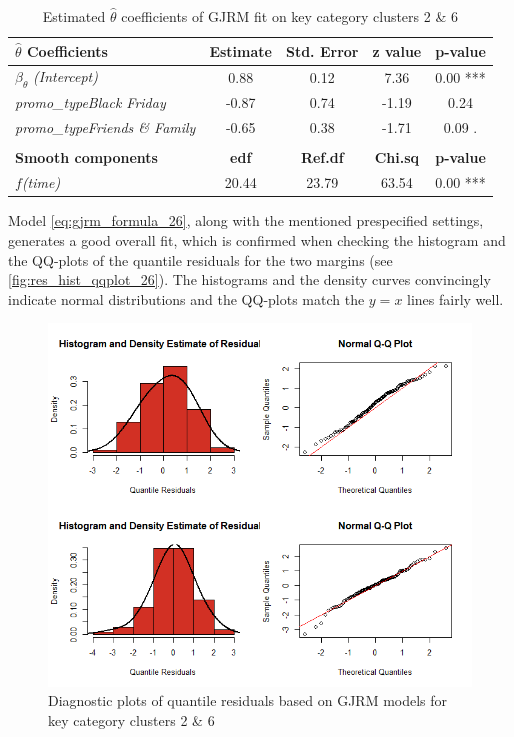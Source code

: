 \begin{table}[H]
\centering
\begin{tabular}{l|c|c|c|c}
\hline
                               \textbf{$\hat{\theta}$ Coefficients}       & \textbf{Estimate} & \textbf{Std. Error} & \textbf{z value} & \textbf{p-value}  \\ \hline\hline
$\beta_{\theta}$ \textit{(Intercept)}                  & 0.88     & 0.12       & 7.36    & 0.00 *** \\ 
\textit{promo\_typeBlack Friday}      & -0.87    & 0.74       & -1.19   & 0.24     \\ 
\textit{promo\_typeFriends \& Family} & -0.65    & 0.38       & -1.71   & 0.09 .   \\ \hline
& & & & \\ \hline
\textbf{Smooth components}            & \textbf{edf}      & \textbf{Ref.df}     & \textbf{Chi.sq}  & \textbf{p-value}  \\ \hline\hline
\textit{$f$(time)}                 & 20.44    & 23.79      & 63.54   & 0.00 *** \\ \hline
\end{tabular}
\caption{Estimated $\hat{\theta}$ coefficients of \ac{GJRM} fit on key category clusters 2 \& 6}
\label{tab:theta_coeff_kcc_26}
\end{table}



Model \ref{eq:gjrm_formula_26}, along with the mentioned prespecified settings, generates a good overall fit, which is confirmed when checking the histogram and the QQ-plots of the quantile residuals for the two margins (see \autoref{fig:res_hist_qqplot_26}). The histograms and the density curves convincingly indicate normal distributions and the QQ-plots match the $y=x$ lines fairly well. 
\\


\begin{figure}[H]
\centering
  \includegraphics[width=0.80\linewidth]{figures/res_hist_qqplot_26.png}
  \caption{Diagnostic plots of quantile residuals based on \ac{GJRM} models for key category clusters 2 \& 6}
  \label{fig:res_hist_qqplot_26}
\end{figure}



